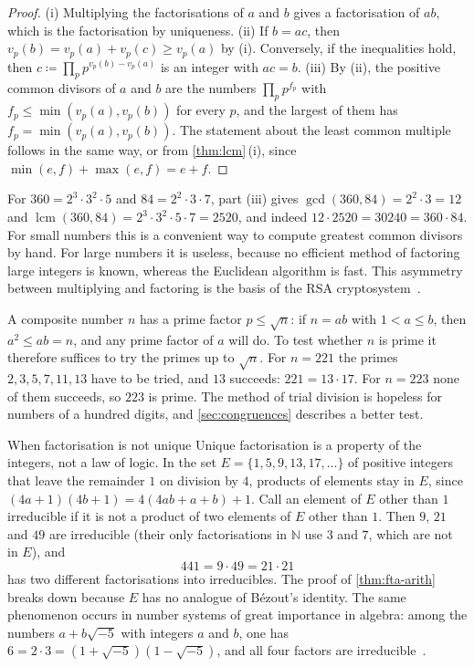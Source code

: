 \begin{proof}
(i) Multiplying the factorisations of $a$ and $b$ gives a factorisation of $ab$, which is the factorisation by uniqueness. (ii) If $b=ac$, then $v_p(b)=v_p(a)+v_p(c)\ge v_p(a)$ by (i). Conversely, if the inequalities hold, then $c\coloneqq\prod_pp^{v_p(b)-v_p(a)}$ is an integer with $ac=b$. (iii) By (ii), the positive common divisors of $a$ and $b$ are the numbers $\prod_pp^{f_p}$ with $f_p\le\min(v_p(a),v_p(b))$ for every $p$, and the largest of them has $f_p=\min(v_p(a),v_p(b))$. The statement about the least common multiple follows in the same way, or from \cref{thm:lcm}\,(i), since $\min(e,f)+\max(e,f)=e+f$.
\end{proof}

For $360=2^3\cdot3^2\cdot5$ and $84=2^2\cdot3\cdot7$, part (iii) gives $\gcd(360,84)=2^2\cdot3=12$ and $\operatorname{lcm}(360,84)=2^3\cdot3^2\cdot5\cdot7=2520$, and indeed $12\cdot2520=30240=360\cdot84$. For small numbers this is a convenient way to compute greatest common divisors by hand. For large numbers it is useless, because no efficient method of factoring large integers is known, whereas the Euclidean algorithm is fast. This asymmetry between multiplying and factoring is the basis of the RSA cryptosystem~\cite{rsa1978}.

A composite number $n$ has a prime factor $p\le\sqrt n$: if $n=ab$ with $1<a\le b$, then $a^2\le ab=n$, and any prime factor of $a$ will do. To test whether $n$ is prime it therefore suffices to try the primes up to $\sqrt n$. For $n=221$ the primes $2,3,5,7,11,13$ have to be tried, and $13$ succeeds: $221=13\cdot17$. For $n=223$ none of them succeeds, so $223$ is prime. The method of trial division is hopeless for numbers of a hundred digits, and \cref{sec:congruences} describes a better test.

\begin{note}{When factorisation is not unique}
Unique factorisation is a property of the integers, not a law of logic. In the set $E=\{1,5,9,13,17,\ldots\}$ of positive integers that leave the remainder $1$ on division by $4$, products of elements stay in $E$, since $(4a+1)(4b+1)=4(4ab+a+b)+1$. Call an element of $E$ other than $1$ irreducible if it is not a product of two elements of $E$ other than $1$. Then $9$, $21$ and $49$ are irreducible (their only factorisations in $\mathbb N$ use $3$ and $7$, which are not in $E$), and
\[
441=9\cdot49=21\cdot21
\]
has two different factorisations into irreducibles. The proof of \cref{thm:fta-arith} breaks down because $E$ has no analogue of B\'ezout's identity. The same phenomenon occurs in number systems of great importance in algebra: among the numbers $a+b\sqrt{-5}$ with integers $a$ and $b$, one has $6=2\cdot3=(1+\sqrt{-5})(1-\sqrt{-5})$, and all four factors are irreducible~\cite{hardywright2008}.
\end{note}

